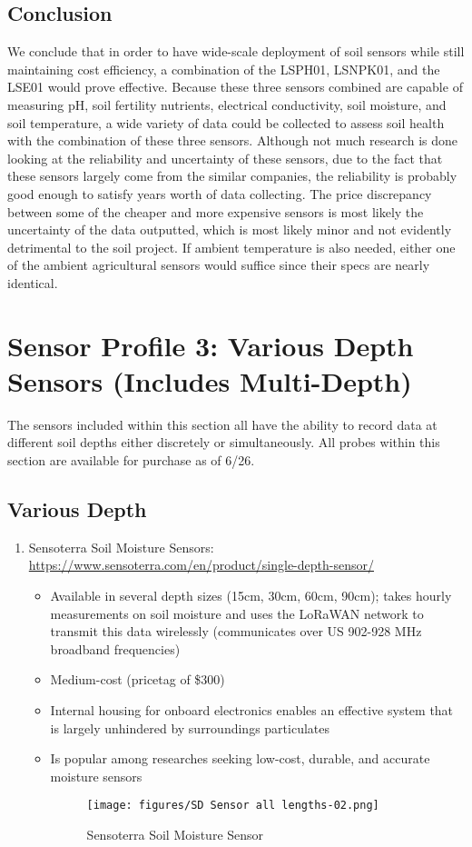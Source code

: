 \documentclass{article}
\begin{document}
\subsection{Conclusion}
We conclude that in order to have wide-scale deployment of soil sensors while still maintaining cost efficiency, a combination of the LSPH01, LSNPK01, and the LSE01 would prove effective. Because these three sensors combined are capable of measuring pH, soil fertility nutrients, electrical conductivity, soil moisture, and soil temperature, a wide variety of data could be collected to assess soil health with the combination of these three sensors. Although not much research is done looking at the reliability and uncertainty of these sensors, due to the fact that these sensors largely come from the similar companies, the reliability is probably good enough to satisfy years worth of data collecting. The price discrepancy between some of the cheaper and more expensive sensors is most likely the uncertainty of the data outputted, which is most likely minor and not evidently detrimental to the soil project. If ambient temperature is also needed, either one of the ambient agricultural sensors would suffice since their specs are nearly identical.

\section{Sensor Profile 3: Various Depth Sensors (Includes Multi-Depth)}
The sensors included within this section all have the ability to record data at different soil depths either discretely or simultaneously. All probes within this section are available for purchase as of 6/26.

\subsection{Various Depth}  
\begin{enumerate}
\item Sensoterra Soil Moisture Sensors: \url{https://www.sensoterra.com/en/product/single-depth-sensor/}
\begin{itemize}

    \item Available in several depth sizes (15cm, 30cm, 60cm, 90cm); takes hourly measurements on soil moisture and uses the LoRaWAN network to transmit this data wirelessly (communicates over US 902-928 MHz broadband frequencies)
    \item Medium-cost (pricetag of \$300)
    \item Internal housing for onboard electronics enables an effective system that is largely unhindered by surroundings particulates
    \item Is popular among researches seeking low-cost, durable, and accurate moisture sensors
    
 \begin{figure}[htp]
    \centering
    \texttt{[image: figures/SD Sensor all lengths-02.png]}
    \caption{Sensoterra Soil Moisture Sensor}
\end{figure}


\end{itemize}
\end{enumerate}
\end{document}
